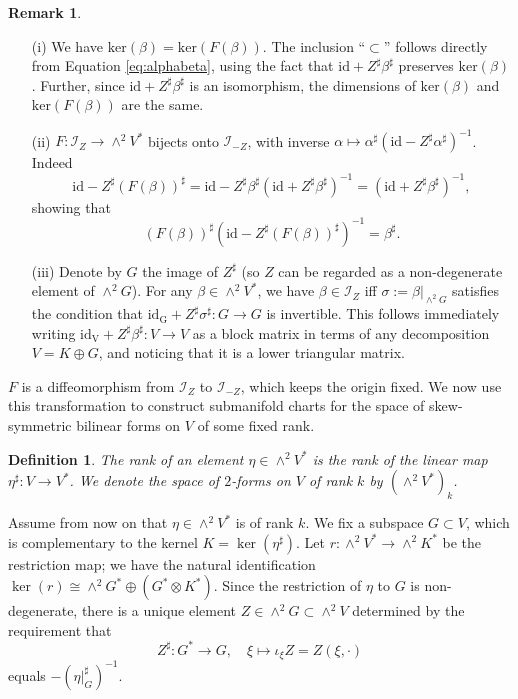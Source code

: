 \documentclass[11pt,thmsa]{amsart}
\newtheorem{definition}[theorem]{Definition}
\theoremstyle{definition}
\newtheorem{remark}[theorem]{Remark}
\newcommand{\id}{\mathrm{id}}
\begin{document}
\begin{remark}\label{rem:alfabeta}
\begin{itemize}
\item[(i)]
We have $\mathrm{ker}(\beta)=\mathrm{ker}(F(\beta))$. The inclusion ``$\subset$'' follows directly from Equation \eqref{eq:alphabeta}, using the fact that $\id+Z^{\sharp}\beta^{\sharp}$ preserves $\mathrm{ker}(\beta)$. Further, since  $\id+Z^{\sharp}\beta^{\sharp}$  is an isomorphism, the dimensions of $\mathrm{ker}(\beta)$ and $\mathrm{ker}(F(\beta))$ are the same.
\item[(ii)]
$F\colon \mathcal{I}_Z \to \wedge^2V^*$ bijects onto $\mathcal{I}_{-Z}$, with inverse $\alpha\mapsto \alpha^\sharp(\id - Z^{\sharp}\alpha^\sharp)^{-1}$.   Indeed $$\id-Z^{\sharp}(F(\beta))^{\sharp}=\id-Z^{\sharp}\beta^\sharp(\id + Z^{\sharp}\beta^\sharp)^{-1}=(\id+Z^{\sharp}\beta^{\sharp})^{-1},$$ showing that $$(F(\beta))^\sharp(\id - Z^{\sharp}(F(\beta))^\sharp)^{-1}
=\beta^\sharp.$$
\item [(iii)] {Denote by $G$ the image of $Z^{\sharp}$ (so $Z$ can be regarded as a non-degenerate element of $\wedge^2 G$).
For any $\beta \in  \wedge^2V^*$, we have  $\beta\in  \mathcal{I}_Z$ if{f} $\sigma:=\beta|_{\wedge^2G}$ satisfies the condition that
$\mathrm{id_G} + Z^\sharp \sigma^\sharp\colon G\to G$ is invertible. This follows immediately writing $\mathrm{id_V} + Z^\sharp \beta^\sharp\colon V\to V$ as a block matrix in terms of any decomposition $V=K\oplus G$, and noticing that it is a lower triangular matrix.}
\end{itemize}
\end{remark}
$F$ is a diffeomorphism from $\mathcal{I}_{Z}$ to $\mathcal{I}_{-Z}$, which keeps the origin fixed.
We now use this transformation to construct submanifold charts for the space of skew-symmetric bilinear forms on $V$ of some fixed rank.

\begin{definition}
The \emph{rank} of an element $\eta \in \wedge^2 V^*$ is the rank
of the linear map $\eta^\sharp: V \to V^*$.
We denote the space of $2$-forms on $V$ of rank $k$ 
by $(\wedge^2V^*)_k$.
\end{definition}


Assume from now on that $\eta \in \wedge^2 V^*$ is of rank $k$.
We fix a subspace $G\subset V$, which is complementary to the kernel $K=\ker(\eta^\sharp)$.
Let
$ r: \wedge^2 V^* \to \wedge^2 K^*$ be the restriction map; we have the natural identification
$\ker(r) \cong \wedge^2 G^* \oplus (G^*\otimes K^*)$.
Since the restriction of $\eta$ to $G$ is non-degenerate, there is a unique
element $Z \in \wedge^2 G \subset\wedge^2 V$ determined by the requirement that
$$ Z^\sharp: G^*\to G, \quad \xi \mapsto \iota_\xi Z=Z(\xi,\cdot)$$
equals $-(\eta\vert_G^\sharp)^{-1}$.  
\end{document}
